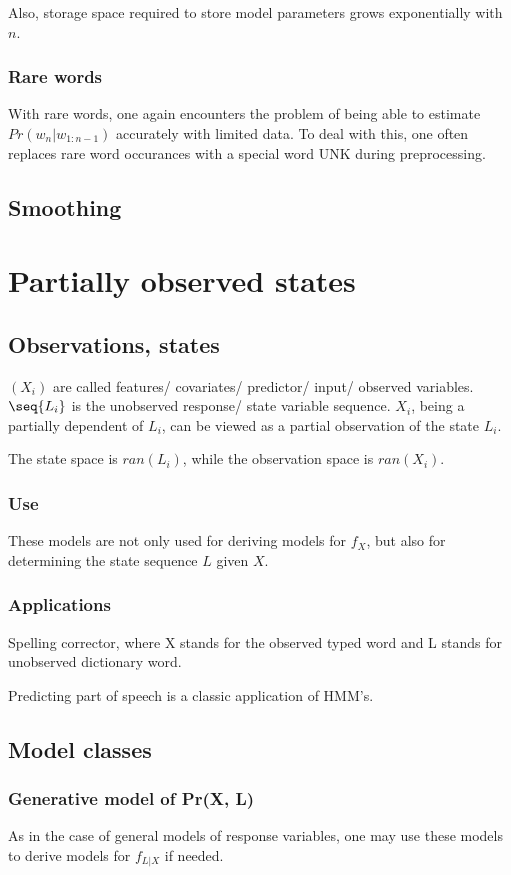 \documentclass[oneside, article]{memoir}
\begin{document}
Also, storage space required to store model parameters grows exponentially with $n$.

\subsubsection{Rare words}
With rare words, one again encounters the problem of being able to estimate $Pr(w_n|w_{1:n-1})$ accurately with limited data. To deal with this, one often replaces rare word occurances with a special word UNK during preprocessing.

\subsection{Smoothing}
\tbc

\section{Partially observed states}
\subsection{Observations, states}
$(X_i)$ are called features/ covariates/ predictor/ input/ observed variables. $\seq{L_i}$ is the unobserved response/ state variable sequence. $X_i$, being a partially dependent of $L_i$, can be viewed as a partial observation of the state $L_i$.

The state space is $ran(L_i)$, while the observation space is $ran(X_i)$.

\subsubsection{Use}
These models are not only used for deriving models for $f_X$, but also for determining the state sequence $L$ given $X$.

\subsubsection{Applications}
Spelling corrector, where X stands for the observed typed word and L stands for unobserved dictionary word. 

Predicting part of speech is a classic application of HMM's.

\subsection{Model classes}
\subsubsection{Generative model of Pr(X, L)}
As in the case of general models of response variables, one may use these models to derive models for $f_{L|X}$ if needed.
\end{document}
